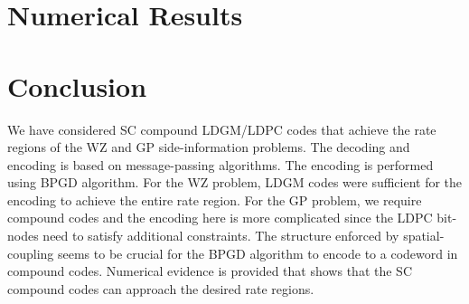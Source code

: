 \documentclass[conference]{IEEEtran}
\begin{document}
\section{Numerical Results}


\section{Conclusion}
We have considered SC compound LDGM/LDPC codes that achieve the rate regions of the WZ and GP side-information problems.
The decoding and encoding is based on message-passing algorithms.
The encoding is performed using BPGD algorithm.
For the WZ problem, LDGM codes were sufficient for the encoding to achieve the entire rate region.
For the GP problem, we require compound codes and the encoding here is more complicated since the LDPC bit-nodes need to satisfy additional constraints.
The structure enforced by spatial-coupling seems to be crucial for the BPGD algorithm to encode to a codeword in compound codes.
Numerical evidence is provided that shows that the SC compound codes can approach the desired rate regions.

\vspace{-0.0mm}


\end{document}
